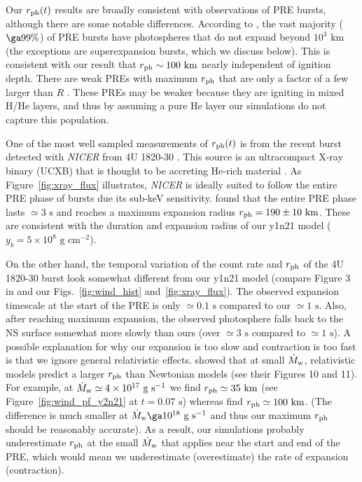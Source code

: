 \documentclass[apj,usenatbib, iop, twocolappendix]{emulateapj}
\newcommand{\Mdot}{\dot{M}_{\rm w}}
\newcommand{\trm}[1]{\textrm{#1}}
\begin{document}
Our $r_{\rm ph}(t)$ results are broadly consistent with observations of  PRE bursts,  although there are some notable differences.  According to , the vast majority ($\ga 99\%$) of  PRE bursts have photospheres that do not expand beyond $10^3\trm{ km}$ (the exceptions are superexpansion bursts, which we discuss below).  This is consistent with our result that $r_{\rm ph}\sim100\trm{ km}$ nearly independent of ignition depth. There are weak PREs with maximum $r_{\rm ph}$ that are only a factor of a few larger than $R$ \citep{Galloway:08}.  These PREs may be weaker because they are igniting in mixed H/He layers, and thus by assuming a pure He layer our simulations do not capture this population.

One of the most well sampled measurements of $r_{\rm ph}(t)$ is from the recent burst detected with {\it NICER} from 4U 1820-30 \citep{Keek:18}. This source is an ultracompact X-ray binary (UCXB) that is thought to be accreting  He-rich material \citep{Cumming:03}.  As Figure~\ref{fig:xray_flux} illustrates, {\it NICER}  is ideally suited to follow the entire PRE phase of bursts due its sub-keV sensitivity.  \citet{Keek:18} found that the entire PRE phase lasts $\simeq 3\trm{ s}$ and reaches a maximum expansion radius $r_{\rm ph}=190\pm 10\trm{ km}$.  These are consistent with the duration and expansion radius of our y1n21 model ($y_b=5\times10^8\trm{ g cm}^{-2}$).

On the other hand, the temporal variation of the count rate and $r_{\rm ph}$ of the 4U 1820-30 burst look somewhat different from our y1n21 model (compare Figure 3 in \citealt{Keek:18} and our Figs.~\ref{fig:wind_hist} and~\ref{fig:xray_flux}).  The observed expansion timescale at the start of the PRE is only $\simeq 0.1\trm{ s}$ compared to our $\simeq 1\trm{ s}$.  Also,  after reaching maximum expansion, the observed photosphere falls back to the NS surface somewhat more slowly than ours (over $\simeq 3\trm{ s}$ compared to $\simeq 1\trm{ s}$).  A possible explanation for why our expansion is too slow and  contraction is too fast is that we ignore general relativistic effects. \citet{Paczynski:86} showed that at small $\Mdot$, relativistic models predict a larger $r_{\rm ph}$ than Newtonian models  (see their Figures 10 and 11).  For example, 
 at $\Mdot \simeq 4\times10^{17}\trm{ g s}^{-1}$ we find $r_{\rm ph}\simeq35\ {\rm km}$ (see Figure~\ref{fig:wind_pf_y2n21} at $t=0.07\trm{ s}$) whereas  \citet{Paczynski:86} find $r_{\rm ph}\simeq100\ {\rm km}$.  (The difference is much smaller at $\Mdot \ga 10^{18}\trm{ g s}^{-1}$ and thus our maximum $r_{\rm ph}$ should be reasonably accurate).  As a result, our simulations probably underestimate $r_{\rm ph}$ at the small $\Mdot$ that applies near the start and end of the PRE, which would mean we underestimate (overestimate) the rate of expansion (contraction).
\end{document}
